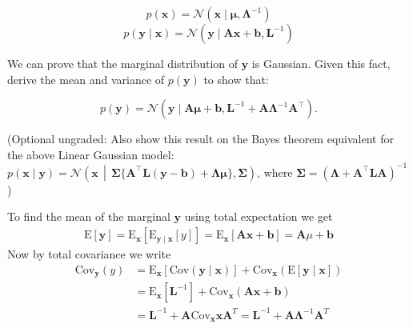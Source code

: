 \documentclass[solution,addpoints,12pt]{exam}
\begin{document}
\begin{questions}
\begin{parts}
\[
p(\mathbf{x}) = \mathcal{N}(\mathbf{x} \mid \boldsymbol{\mu}, \boldsymbol{\Lambda}^{-1})
\]
\[
p(\mathbf{y} \mid \mathbf{x}) = \mathcal{N}(\mathbf{y} \mid \mathbf{A}\mathbf{x} + \mathbf{b}, \mathbf{L}^{-1})
\]

We can prove that the marginal distribution of $\mathbf{y}$ is Gaussian. Given this fact, derive the mean and variance of $p(\mathbf{y})$ to show that:

\[
p(\mathbf{y}) = \mathcal{N}(\mathbf{y} \mid \mathbf{A}{\boldsymbol{\mu}} + \mathbf{b}, \mathbf{L}^{-1} + \mathbf{A}\boldsymbol{\Lambda}^{-1}\mathbf{A}^\top).
\]

(Optional ungraded: Also show this result on the Bayes theorem equivalent for the above Linear Gaussian model:
$
p(\mathbf{x} \mid \mathbf{y}) = \mathcal{N}\!\left(\mathbf{x} \,\middle|\, 
\boldsymbol{\Sigma}\{\mathbf{A}^\top \mathbf{L}(\mathbf{y} - \mathbf{b}) + \boldsymbol{\Lambda}\boldsymbol{\mu}\}, \boldsymbol{\Sigma}\right)
$, where
$
\boldsymbol{\Sigma} = \left(\boldsymbol{\Lambda} + \mathbf{A}^\top \mathbf{L}\mathbf{A}\right)^{-1}$)
\begin{solution}
	To find the mean of the marginal $\mathbf{y}$ using total expectation we get
	\begin{align*}
		\mathrm{E}[\mathbf{y}]=\mathrm{E}_{\mathbf{x}}\left[\mathrm{E}_{\mathbf{y}\mid\mathbf{x}}[y]\right]=\mathrm{E}_{\mathbf{x}}\left[\mathbf{Ax+b}\right]=\mathbf{A}\mu+\mathbf{b}
	\end{align*}
	Now by total covariance we write
	\begin{align*}
		\mathrm{Cov}_{\mathbf{y}}(y)&=\mathrm{E}_{\mathbf{x}}\left[\mathrm{Cov}(\mathbf{y}\mid \mathbf{x})\right]+\mathrm{Cov}_{\mathbf{x}}\left(\mathrm{E}\left[\mathbf{y}\mid\mathbf{x}\right]\right)\\
		&=\mathrm{E}_{\mathbf{x}}\left[\mathbf{L}^{-1}\right]+\mathrm{Cov}_{\mathbf{x}}\left(\mathbf{A}\mathbf{x+b}\right)\\
		&= \mathbf{L}^{-1}+\mathbf{A}\mathrm{Cov}_{\mathbf{x}}\mathbf{x}\mathbf{A}^T=\mathbf{L}^{-1}+\mathbf{A}\boldsymbol{\Lambda}^{-1}\mathbf{A}^T
	\end{align*} 
\end{solution}
\end{parts}


\\
\begin{parts}

\end{parts}
\end{questions}
\end{document}
